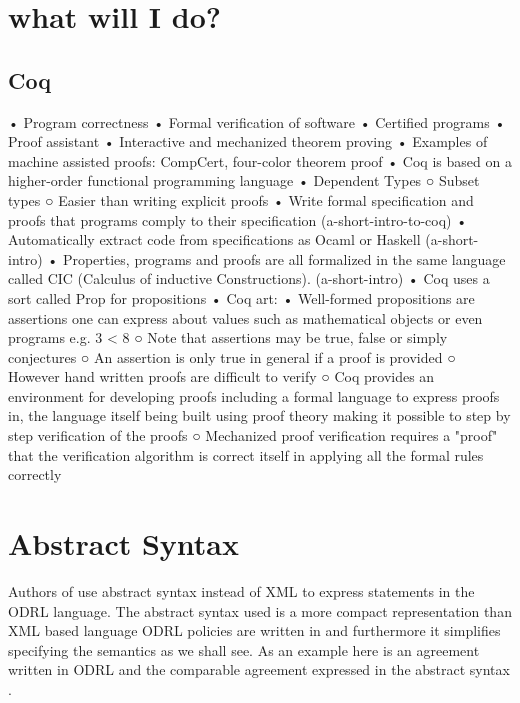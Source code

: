 \section{what will I do?}


\subsection{Coq}


	• Program correctness
	• Formal verification of software
	• Certified programs
	• Proof assistant
	• Interactive and mechanized theorem proving
	• Examples of machine assisted proofs: CompCert, four-color theorem proof
	• Coq is based on a higher-order functional programming language
	• Dependent Types
		○ Subset types
		○ Easier than writing explicit proofs
	• Write formal specification and proofs that programs comply to their specification (a-short-intro-to-coq)
	• Automatically extract code from specifications as Ocaml or Haskell (a-short-intro)
	• Properties, programs and proofs are all formalized in the same language called CIC (Calculus of inductive Constructions). (a-short-intro)
	• Coq uses a sort called Prop for propositions
	• Coq art:
	• Well-formed propositions are assertions  one can express about values such as mathematical objects or even programs e.g. 3 < 8
		○ Note that assertions may be true, false or simply conjectures
		○ An assertion is only true in general if a proof is provided
		○ However hand written proofs are difficult to verify
		○ Coq provides an environment for developing proofs including a formal language to express proofs in, the language itself being built using proof theory making it possible to step by step verification of the proofs
		○ Mechanized proof verification requires a "proof" that the verification algorithm is correct itself in applying all the formal rules correctly







\section{Abstract Syntax}

Authors of \cite{pucella2006} use abstract syntax instead of XML to express statements in the ODRL language. The abstract syntax used is a more compact representation than XML based language ODRL policies are written in and furthermore it simplifies specifying the semantics as we shall see. As an example here is an agreement written in ODRL and the comparable agreement expressed in the abstract syntax \cite{pucella2006}.

